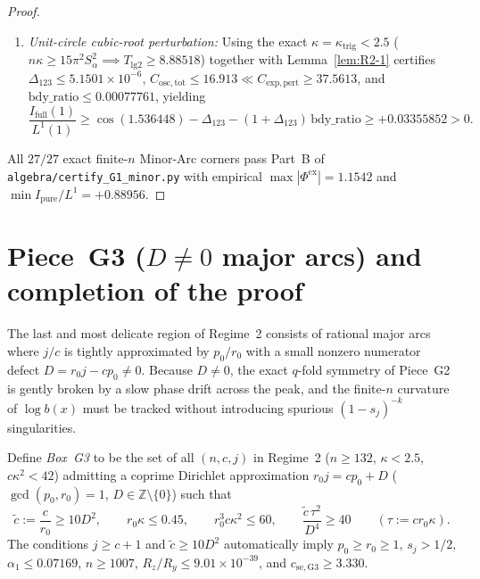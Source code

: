 \documentclass[10pt]{article}
\numberwithin{equation}{section}
\theoremstyle{plain}
\theoremstyle{definition}
\newcommand{\Z}{\mathbb{Z}}
\newcommand{\1}{\mathbf{1}}
\newcommand{\code}[1]{\texttt{#1}}
\begin{document}
\begin{proof}
\begin{enumerate}[label=\textbf{G1.\arabic*},leftmargin=2.8em]
    \item \emph{Unit-circle cubic-root perturbation:} Using the exact $\kappa = \kappa_{\mathrm{trig}} < 2.5$ ($n\kappa \ge 15\pi^2 S_\alpha^2 \implies T_{\mathrm{lg2}} \ge 8.88518$) together with Lemma~\ref{lem:R2-1} certifies $\Delta_{123} \le 5.1501 \times 10^{-6}$, $C_{\mathrm{osc,tot}} \le 16.913 \ll C_{\mathrm{exp,pert}} \ge 37.5613$, and $\mathrm{bdy\_ratio} \le 0.00077761$, yielding
    \[
    \frac{I_{\mathrm{full}}(1)}{L^1(1)} \ge \cos(1.536448) - \Delta_{123} - (1 + \Delta_{123})\,\mathrm{bdy\_ratio} \ge +0.03355852 > 0.
    \]
\end{enumerate}
All $27/27$ exact finite-$n$ Minor-Arc corners pass Part~B of \code{algebra/certify\_G1\_minor.py} with empirical $\max|\Phi^{\mathrm{ex}}| = 1.1542$ and $\min I_{\mathrm{pure}}/L^1 = +0.88956$.
\end{proof}

\section{Piece~G3 (\texorpdfstring{$D \ne 0$}{D != 0} major arcs) and completion of the proof}
\label{sec:G3}

The last and most delicate region of Regime~2 consists of rational major arcs where $j/c$ is tightly approximated by $p_0/r_0$ with a small nonzero numerator defect $D = r_0 j - c p_0 \ne 0$. Because $D \ne 0$, the exact $q$-fold symmetry of Piece~G2 is gently broken by a slow phase drift across the peak, and the finite-$n$ curvature of $\log b(x)$ must be tracked without introducing spurious $(1 - s_j)^{-k}$ singularities.

Define \emph{Box~G3} to be the set of all $(n, c, j)$ in Regime~2 ($n \ge 132$, $\kappa < 2.5$, $c\kappa^2 < 42$) admitting a coprime Dirichlet approximation $r_0 j = c p_0 + D$ ($\gcd(p_0, r_0) = 1$, $D \in \Z \setminus \{0\}$) such that
\begin{equation}\label{eq:box-G3}
\tilde{c} := \frac{c}{r_0} \ge 10 D^2, \qquad
r_0\kappa \le 0.45, \qquad
r_0^3 c\kappa^2 \le 60, \qquad
\frac{\tilde{c}\,\tau^2}{D^4} \ge 40 \qquad (\tau := c r_0 \kappa).
\end{equation}
The conditions $j \ge c + 1$ and $\tilde{c} \ge 10 D^2$ automatically imply $p_0 \ge r_0 \ge 1$, $s_j > 1/2$, $\alpha_1 \le 0.07169$, $n \ge 1007$, $R_z/R_y \le 9.01 \times 10^{-39}$, and $c_{\mathrm{se,G3}} \ge 3.330$.
\end{document}
